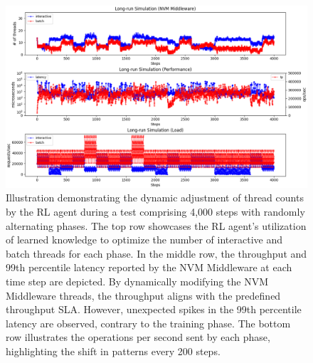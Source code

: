 \label{appendix:e}

\begin{figure}[ht]
  \centering
  \includegraphics[width=\textwidth,height=\textheight,keepaspectratio]{images/long_run_sim.png}
  \caption[RL Agent Adaptation to Shifting Workloads]{Illustration demonstrating the dynamic adjustment of thread counts by the RL agent during a test comprising 4,000 steps with randomly alternating phases. The top row showcases the RL agent's utilization of learned knowledge to optimize the number of interactive and batch threads for each phase. In the middle row, the throughput and 99th percentile latency reported by the NVM Middleware at each time step are depicted. By dynamically modifying the NVM Middleware threads, the throughput aligns with the predefined throughput SLA. However, unexpected spikes in the 99th percentile latency are observed, contrary to the training phase. The bottom row illustrates the operations per second sent by each phase, highlighting the shift in patterns every 200 steps.}
  \label{fig:long_run_eval}
\end{figure}

